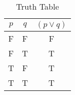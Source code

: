 \begin{table}[ht]
\caption{Truth Table}
\centering
\begin{tabular}{|c|c||c|}
\hline
$ p $ & $ q $ & $ (p \vee q) $ \\
\hline
F & F & F \\
F & T & T \\
T & F & T \\
T & T & T \\
\hline
\end{tabular}
\label{table:tt1}
\end{table}
